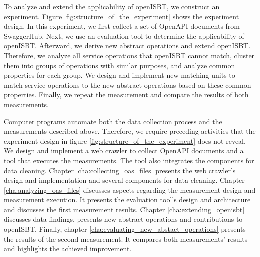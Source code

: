 To analyze and extend the applicability of openISBT, we construct an experiment. Figure \ref{fig:structure_of_the_experiment} shows the experiment design. In this experiment, we first collect a set of OpenAPI documents from SwaggerHub. Next, we use an evaluation tool to determine the applicability of openISBT.
Afterward, we derive new abstract operations and extend openISBT. Therefore, we analyze all service operations that openISBT cannot match, cluster them into groups of operations with similar purposes, and analyze common properties for each group.  We design and implement new matching units to match service operations to the new abstract operations based on these common properties. Finally, we repeat the measurement and compare the results of both measurements.


Computer programs automate both the data collection process and the measurements described above. Therefore, we require preceding activities that the experiment design in figure \ref{fig:structure_of_the_experiment} does not reveal. We design and implement a web crawler to collect OpenAPI documents and a tool that executes the measurements. The tool also integrates the components for data cleaning. Chapter \ref{cha:collecting_oas_files} presents the web crawler's design and implementation and several components for data cleaning. Chapter \ref{cha:analyzing_oas_files} discusses aspects regarding the measurement design and measurement execution. It presents the evaluation tool's design and architecture and discusses the first measurement results. 
Chapter \ref{cha:extending_openisbt} discusses data findings, presents new abstract operations and contributions to openISBT.
Finally, chapter \ref{cha:evaluating_new_abstact_operations} presents the results of the second measurement. It compares both measurements' results and highlights the achieved improvement.


